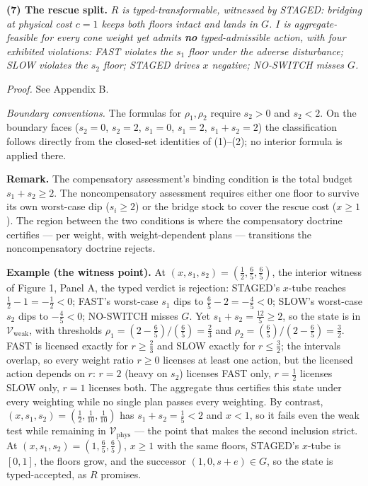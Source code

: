 \documentclass[3p,11pt]{elsarticle}
\begin{document}
\textbf{(7) The rescue split.} \emph{\(R\) is typed-transformable,
witnessed by STAGED: bridging at physical cost \(c = 1\) keeps both
floors intact and lands in \(G\). \(I\) is aggregate-feasible for every
cone weight yet admits \textbf{no} typed-admissible action, with four
exhibited violations: FAST violates the \(s_1\) floor under the adverse
disturbance; SLOW violates the \(s_2\) floor; STAGED drives \(x\)
negative; NO-SWITCH misses \(G\).}

\emph{Proof.} See Appendix B.

\emph{Boundary conventions.} The formulas for \(\rho_1, \rho_2\) require
\(s_2 > 0\) and \(s_2 < 2\). On the boundary faces (\(s_2 = 0\),
\(s_2 = 2\), \(s_1 = 0\), \(s_1 = 2\), \(s_1 + s_2 = 2\)) the
classification follows directly from the closed-set identities of
(1)--(2); no interior formula is applied there.

\textbf{Remark.} The compensatory assessment's binding condition is the
total budget \(s_1 + s_2 \ge 2\). The noncompensatory assessment requires either one floor to survive its own worst-case dip (\(s_i \ge 2\)) or the bridge stock to cover the rescue cost (\(x \ge 1\)). The region between the two conditions is
where the compensatory doctrine certifies --- per weight, with
weight-dependent plans --- transitions the noncompensatory doctrine
rejects.

\textbf{Example (the witness point).} At \((x, s_1, s_2) = (\tfrac12, \tfrac65, \tfrac65)\), the interior witness of Figure 1, Panel A, the typed verdict is rejection: STAGED's \(x\)-tube reaches \(\tfrac12 - 1 = -\tfrac12 < 0\); FAST's worst-case \(s_1\) dips to \(\tfrac65 - 2 = -\tfrac45 < 0\); SLOW's worst-case \(s_2\) dips to \(-\tfrac45 < 0\); NO-SWITCH misses \(G\). Yet \(s_1 + s_2 = \tfrac{12}{5} \ge 2\), so the state is in \(\mathcal{V}_{\mathrm{weak}}\), with thresholds \(\rho_1 = (2 - \tfrac65)/(\tfrac65) = \tfrac23\) and \(\rho_2 = (\tfrac65)/(2 - \tfrac65) = \tfrac32\). FAST is licensed exactly for \(r \ge \tfrac23\) and SLOW exactly for \(r \le \tfrac32\); the intervals overlap, so every weight ratio \(r \ge 0\) licenses at least one action, but the licensed action depends on \(r\): \(r = 2\) (heavy on \(s_2\)) licenses FAST only, \(r = \tfrac12\) licenses SLOW only, \(r = 1\) licenses both. The aggregate thus certifies this state under every weighting while no single plan passes every weighting. By contrast, \((x, s_1, s_2) = (\tfrac12, \tfrac1{10}, \tfrac1{10})\) has \(s_1 + s_2 = \tfrac15 < 2\) and \(x < 1\), so it fails even the weak test while remaining in \(\mathcal{V}_{\mathrm{phys}}\) --- the point that makes the second inclusion strict. At \((x, s_1, s_2) = (1, \tfrac65, \tfrac65)\), \(x \ge 1\) with the same floors, STAGED's \(x\)-tube is \([0, 1]\), the floors grow, and the successor \((1, 0, s + e) \in G\), so the state is typed-accepted, as \(R\) promises.
\end{document}
